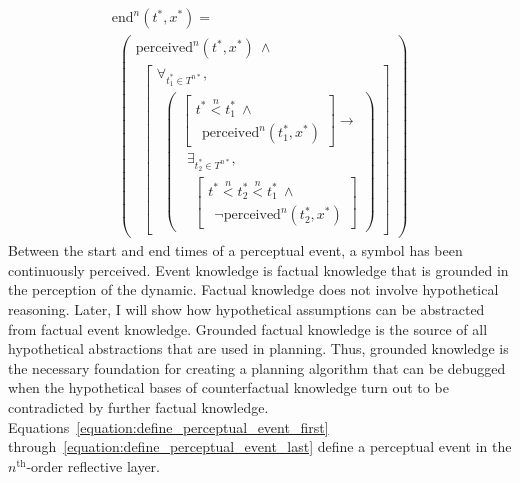 \begin{equation}
\label{equation:define_event_end}
\begin{array}{l}
  \text{end}^n(t^*, x^*) = \\
  ~~\left(
  \begin{array}{l}
  \text{perceived}^n(t^*, x^*) ~\wedge~ \\
  ~~\left[
  \begin{array}{l}
  \forall_{t_1^* \in T^{n*}}, \\
  ~~\left(\begin{array}{l}
            \left[\begin{array}{l}
                    t^* \stackrel{n}{<} t_1^* ~\wedge~ \\
                    ~~\text{perceived}^n(t_1^*, x^*)\end{array}\right] \longrightarrow \\
            ~~\exists_{t_2^* \in T^{n*}}, \\
            ~~~~\left[\begin{array}{l}
                        t^* \stackrel{n}{<} t_2^* \stackrel{n}{<} t_1^* ~\wedge~ \\
                        ~~\neg\text{perceived}^n(t_2^*, x^*)\end{array}\right]\end{array}\right)
  \end{array}
  \right]
  \end{array}\right)
\end{array}
\end{equation}
Between the start and end times of a perceptual event, a symbol has
been continuously perceived.  Event knowledge is factual knowledge
that is grounded in the perception of the dynamic.  Factual knowledge
does not involve hypothetical reasoning.  Later, I will show how
hypothetical assumptions can be abstracted from factual event
knowledge.  Grounded factual knowledge is the source of all
hypothetical abstractions that are used in planning.  Thus, grounded
knowledge is the necessary foundation for creating a planning
algorithm that can be debugged when the hypothetical bases of
counterfactual knowledge turn out to be contradicted by further
factual knowledge.
{\mbox{Equations~\ref{equation:define_perceptual_event_first}}}
{\mbox{through~\ref{equation:define_perceptual_event_last}}} define a
perceptual event in the $n^{\text{th}}$-order reflective layer.
